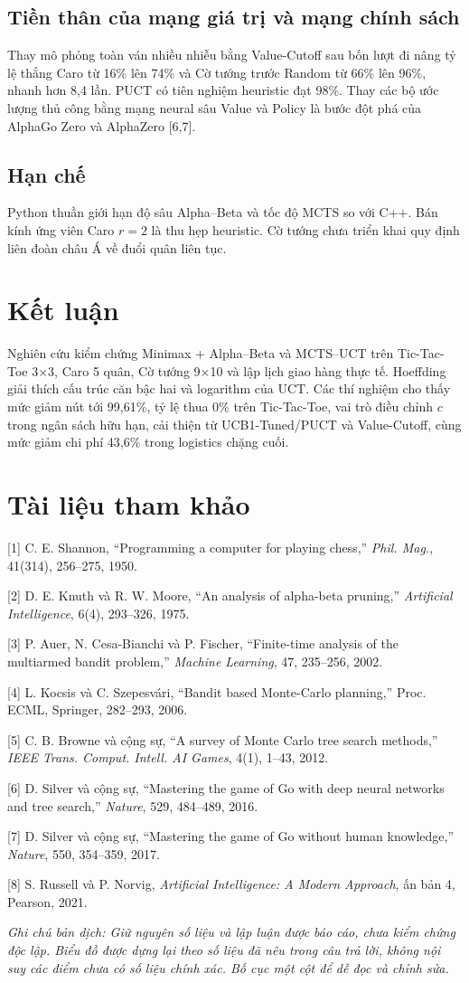 \documentclass[11pt,a4paper]{article}
\begin{document}
\subsection{Tiền thân của mạng giá trị và mạng chính sách}
Thay mô phỏng toàn ván nhiều nhiễu bằng Value-Cutoff sau bốn lượt đi nâng tỷ lệ thắng Caro từ 16\% lên 74\% và Cờ tướng trước Random từ 66\% lên 96\%, nhanh hơn 8,4 lần. PUCT có tiên nghiệm heuristic đạt 98\%. Thay các bộ ước lượng thủ công bằng mạng neural sâu Value và Policy là bước đột phá của AlphaGo Zero và AlphaZero [6,7].
\subsection{Hạn chế}
Python thuần giới hạn độ sâu Alpha–Beta và tốc độ MCTS so với C++. Bán kính ứng viên Caro $r=2$ là thu hẹp heuristic. Cờ tướng chưa triển khai quy định liên đoàn châu Á về đuổi quân liên tục.
\section{Kết luận}
Nghiên cứu kiểm chứng Minimax + Alpha–Beta và MCTS–UCT trên Tic-Tac-Toe 3×3, Caro 5 quân, Cờ tướng 9×10 và lập lịch giao hàng thực tế. Hoeffding giải thích cấu trúc căn bậc hai và logarithm của UCT. Các thí nghiệm cho thấy mức giảm nút tới 99,61\%, tỷ lệ thua 0\% trên Tic-Tac-Toe, vai trò điều chỉnh $c$ trong ngân sách hữu hạn, cải thiện từ UCB1-Tuned/PUCT và Value-Cutoff, cùng mức giảm chi phí 43,6\% trong logistics chặng cuối.
\section*{Tài liệu tham khảo}
\small
[1] C. E. Shannon, “Programming a computer for playing chess,” \textit{Phil. Mag.}, 41(314), 256–275, 1950.

[2] D. E. Knuth và R. W. Moore, “An analysis of alpha-beta pruning,” \textit{Artificial Intelligence}, 6(4), 293–326, 1975.

[3] P. Auer, N. Cesa-Bianchi và P. Fischer, “Finite-time analysis of the multiarmed bandit problem,” \textit{Machine Learning}, 47, 235–256, 2002.

[4] L. Kocsis và C. Szepesvári, “Bandit based Monte-Carlo planning,” Proc. ECML, Springer, 282–293, 2006.

[5] C. B. Browne và cộng sự, “A survey of Monte Carlo tree search methods,” \textit{IEEE Trans. Comput. Intell. AI Games}, 4(1), 1–43, 2012.

[6] D. Silver và cộng sự, “Mastering the game of Go with deep neural networks and tree search,” \textit{Nature}, 529, 484–489, 2016.

[7] D. Silver và cộng sự, “Mastering the game of Go without human knowledge,” \textit{Nature}, 550, 354–359, 2017.

[8] S. Russell và P. Norvig, \textit{Artificial Intelligence: A Modern Approach}, ấn bản 4, Pearson, 2021.

\medskip\noindent\textit{Ghi chú bản dịch: Giữ nguyên số liệu và lập luận được báo cáo, chưa kiểm chứng độc lập. Biểu đồ được dựng lại theo số liệu đã nêu trong câu trả lời, không nội suy các điểm chưa có số liệu chính xác. Bố cục một cột để dễ đọc và chỉnh sửa.}
\end{document}
